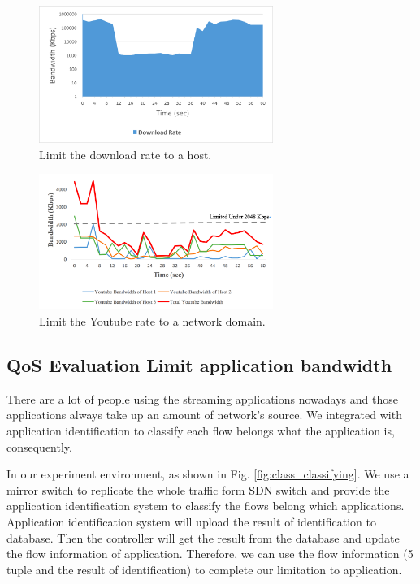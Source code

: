 \documentclass[journal]{IEEEtran}
\begin{document}
\begin{figure}[!t]
\centering
\includegraphics[width=3in]{./figures/qos_limit_host}
\caption{Limit the download rate to a host.}
\label{fig:qos_limit_host}
\end{figure}

\begin{figure}[!t]
\centering
\includegraphics[width=3in]{./figures/mft_qos_rate_domain_app}
\caption{Limit the Youtube rate to a network domain.}
\label{fig:mft_qos_rate_domain_app}
\end{figure}

\subsection{QoS Evaluation Limit application bandwidth}

There are a lot of people using the streaming applications nowadays and those applications always take up an amount of network’s source. We integrated with application identification to classify each flow belongs what the application is, consequently.

In our experiment environment, as shown in Fig. \ref{fig:class_classifying}. We use a mirror switch to replicate the whole traffic form SDN switch and provide the application identification system to classify the flows belong which applications. Application identification system will upload the result of identification to database. Then the controller will get the result from the database and update the flow information of application. Therefore, we can use the flow information (5 tuple and the result of identification) to complete our limitation to application.
\end{document}

